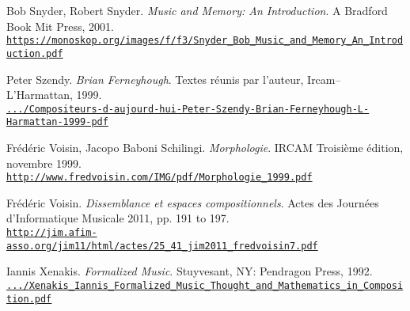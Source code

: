 \begin{thebibliography}{99}
	Bob Snyder, Robert Snyder. \textit{Music and Memory: An Introduction}. A Bradford Book
Mit Press, 2001.\\ 
	\href{https://monoskop.org/images/f/f3/Snyder\_Bob\_Music\_and\_Memory\_An\_Introduction.pdf}{\scriptsize{\texttt{https://monoskop.org/images/f/f3/Snyder\_Bob\_Music\_and\_Memory\_An\_Introduction.pdf}}} \normalsize{}
	
	Peter Szendy. \textit{Brian Ferneyhough}. Textes réunis par l'auteur, Ircam--L'Har\-mattan, 1999.\\ 
	\href{https://www.scribd.com/document/365564172/Compositeurs-d-aujourd-hui-Peter-Szendy-Brian-Ferneyhough-L-Harmattan-1999-pdf}{\scriptsize{\texttt{.../Compositeurs-d-aujourd-hui-Peter-Szendy-Brian-Ferneyhough-L-Harmattan-1999-pdf}}} \normalsize{}
			
	Fr\'{e}d\'{e}ric Voisin, Jacopo Baboni Schilingi. \textit{Morphologie}. IRCAM Troisi\`{e}me \'{e}dition, novembre 1999.\\ 
	\href{http://www.fredvoisin.com/IMG/pdf/Morphologie\_1999.pdf}{\scriptsize{\texttt{http://www.fredvoisin.com/IMG/pdf/Morphologie\_1999.pdf}}} \normalsize{}
	
	Fr\'{e}d\'{e}ric Voisin. \textit{Dissemblance et espaces compositionnels}. Actes des Journées d’Informatique Musicale 2011, pp. 191 to 197.\\ 
	\href{http://jim.afim-asso.org/jim11/html/actes/25\_41\_jim2011\_fredvoisin7.pdf}{\scriptsize{\texttt{http://jim.afim-asso.org/jim11/html/actes/25\_41\_jim2011\_fredvoisin7.pdf}}} \normalsize{}

	Iannis Xenakis. \textit{Formalized Music}. Stuyvesant, NY: Pendragon Press, 1992.\\ 
	\href{https://monoskop.org/images/7/74/Xenakis\_Iannis\_Formalized\_Music\_Thought\_and\_Mathematics\_in\_Composition.pdf}{\scriptsize{\texttt{.../Xenakis\_Iannis\_Formalized\_Music\_Thought\_and\_Mathematics\_in\_Composition.pdf}}} \normalsize{}

\end{thebibliography}